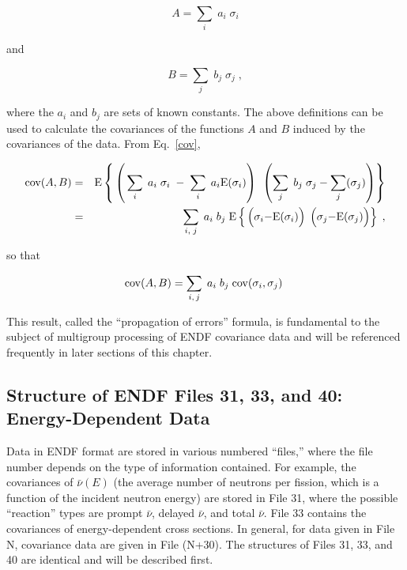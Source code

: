 \begin{equation}
A =\sum_{i} \; a_i \; \sigma_i
\end{equation}

\noindent
and

\begin{equation}
B =\sum_{j} \; b_j \; \sigma_j \; ,
\end{equation}

\noindent
where the $a_i$ and $b_j$ are sets of known constants.  The above
definitions can be used to calculate the covariances of the functions
$A$ and $B$ induced by the covariances of the data.
From Eq.~\ref{cov},

\begin{eqnarray} {\rm cov}(A,B) & = & {\rm E} \left\{ {\vphantom{\sum_j}}\left
({\vphantom{\sum_j}}\sum_{i} \; a_i \; \sigma_i \; - \;\sum_{i}\; a_i {\rm E}
(\sigma_i)\right)\;{\vphantom{\sum_j}}\left(\sum_{j} \;b_j \;\sigma_j - \sum_{j}
(\sigma_j )\right )\right \} \nonumber \\
 & = & \sum_{i,\; j} \; a_i \; b_j \; {\rm E} \left \{ {\vphantom{\sum}}\left
({\vphantom{\sum}}\sigma_i
 {-}  {\rm E} (\sigma_i)  \right ) \;
 \left ({\vphantom{\sum}} \sigma_j{-}{\rm E} (\sigma_j) \right)  \right \}  \;,
\end{eqnarray}

\noindent
so that

\begin{equation}
{\rm cov}(A,B) = \sum_{i,\,j} \; a_i \; b_j \; {\rm cov}(\sigma_i , \sigma_j ) \
\label{e11}
\end{equation}

\noindent
This result, called the ``propagation of errors'' formula, is
fundamental to the subject of multigroup processing of ENDF covariance
data and will be referenced frequently in later sections of this
chapter.

\subsection{Structure of ENDF Files 31, 33, and 40: Energy-Dependent Data}
\label{ssERRORR_Str}

Data in ENDF format are stored in various numbered ``files,'' where the
file number depends on the type of information contained.  For example,
the covariances of $\bar{\nu}(E)$ (the average number of neutrons per
fission, which is a function of the incident neutron energy) are stored
in File 31, where the possible ``reaction'' types are prompt
$\bar{\nu}$, delayed $\bar{\nu}$, and total $\bar{\nu}$.  File 33
contains the covariances of energy-dependent cross sections.  In
general, for data given in File N, covariance data are given in
File (N+30).  The structures of Files 31, 33, and 40 are identical
and will be described first.

